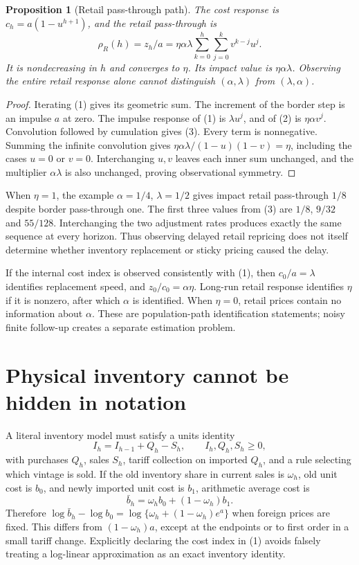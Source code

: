 \documentclass[11pt,a4paper]{article}
\newtheorem{proposition}[theorem]{Proposition}
\begin{document}
\begin{proposition}[Retail pass-through path]
The cost response is $c_h=a(1-u^{h+1})$, and the retail pass-through is
\[
 \rho_R(h)=z_h/a
 =\eta\alpha\lambda\sum_{k=0}^h\sum_{j=0}^k v^{k-j}u^j.   \tag{3}
\]
It is nondecreasing in $h$ and converges to $\eta$. Its impact value is $\eta\alpha\lambda$. Observing the entire retail response alone cannot distinguish $(\alpha,\lambda)$ from $(\lambda,\alpha)$.
\end{proposition}
\begin{proof}
Iterating (1) gives its geometric sum. The increment of the border step is an impulse $a$ at zero. The impulse response of (1) is $\lambda u^j$, and of (2) is $\eta\alpha v^j$. Convolution followed by cumulation gives (3). Every term is nonnegative. Summing the infinite convolution gives
$\eta\alpha\lambda/(1-u)(1-v)=\eta$, including the cases $u=0$ or $v=0$. Interchanging $u,v$ leaves each inner sum unchanged, and the multiplier $\alpha\lambda$ is also unchanged, proving observational symmetry.
\end{proof}

When $\eta=1$, the example $\alpha=1/4$, $\lambda=1/2$ gives impact retail pass-through $1/8$ despite border pass-through one. The first three values from (3) are $1/8$, $9/32$ and $55/128$. Interchanging the two adjustment rates produces exactly the same sequence at every horizon. Thus observing delayed retail repricing does not itself determine whether inventory replacement or sticky pricing caused the delay.

If the internal cost index is observed consistently with (1), then $c_0/a=\lambda$ identifies replacement speed, and $z_0/c_0=\alpha\eta$. Long-run retail response identifies $\eta$ if it is nonzero, after which $\alpha$ is identified. When $\eta=0$, retail prices contain no information about $\alpha$. These are population-path identification statements; noisy finite follow-up creates a separate estimation problem.

\section{Physical inventory cannot be hidden in notation}
A literal inventory model must satisfy a units identity
\[
 I_h=I_{h-1}+Q_h-S_h,\qquad I_h,Q_h,S_h\ge0,               \tag{4}
\]
with purchases $Q_h$, sales $S_h$, tariff collection on imported $Q_h$, and a rule selecting which vintage is sold. If the old inventory share in current sales is $\omega_h$, old unit cost is $b_0$, and newly imported unit cost is $b_1$, arithmetic average cost is
\[
 \bar b_h=\omega_hb_0+(1-\omega_h)b_1.
\]
Therefore $\log\bar b_h-\log b_0=\log\{\omega_h+(1-\omega_h)e^a\}$ when foreign prices are fixed. This differs from $(1-\omega_h)a$, except at the endpoints or to first order in a small tariff change. Explicitly declaring the cost index in (1) avoids falsely treating a log-linear approximation as an exact inventory identity.
\end{document}
